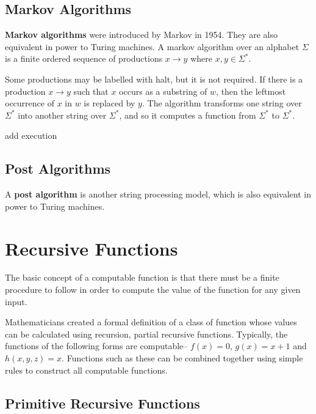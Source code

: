 \subsection*{Markov Algorithms}

\textbf{Markov algorithms} were introduced by Markov in 1954. They are also equivalent in power to Turing machines.
 A markov algorithm over an alphabet $\Sigma$ is a finite ordered sequence of productions $x \rightarrow y$ where
 $x,y \in \Sigma^*$.

Some productions may be labelled with halt, but it is not required. If there is a production $x \rightarrow y$ such that
 $x$ occurs as a substring of $w$, then the leftmost occurrence of $x$ in $w$ is replaced by $y$. The algorithm
 transforms one string over $\Sigma^*$ into another string over $\Sigma^*$, and so it computes a function from 
 $\Sigma^*$ to $\Sigma^*$.

{\Huge add execution}

\subsection*{Post Algorithms}

A \textbf{post algorithm} is another string processing model, which is also equivalent in power to Turing machines.




\section*{Recursive Functions}

The basic concept of a computable function is that there must be a finite procedure to follow in order to compute the
 value of the function for any given input.

Mathematicians created a formal definition of a class of function whose values can be calculated using recursion,
 partial recursive functions. Typically, the functions of the following forms are computable-- $f(x) = 0$, $g(x) = x+1$
 and $h(x,y,z) = x$. Functions such as these can be combined together using simple rules to construct all computable
 functions.

\subsection*{Primitive Recursive Functions}

